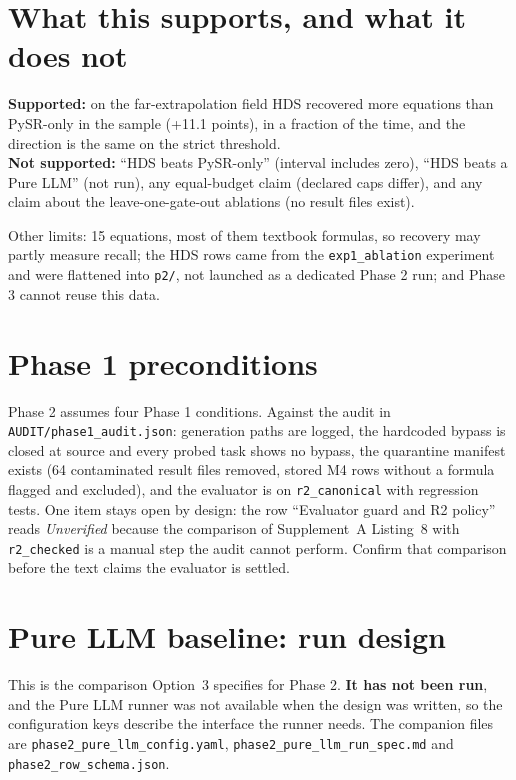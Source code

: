\documentclass[11pt,a4paper]{article}
\newcommand{\code}[1]{\texttt{#1}}
\begin{document}
\section{What this supports, and what it does not}
\begin{caution}
\textbf{Supported:} on the far-extrapolation field HDS recovered more equations than PySR-only in the sample (+11.1 points), in a fraction of the time, and the direction is the same on the strict threshold.\\
\textbf{Not supported:} ``HDS beats PySR-only'' (interval includes zero), ``HDS beats a Pure LLM'' (not run), any equal-budget claim (declared caps differ), and any claim about the leave-one-gate-out ablations (no result files exist).
\end{caution}
Other limits: 15 equations, most of them textbook formulas, so recovery may partly measure recall; the HDS rows came from the \code{exp1\_ablation} experiment and were flattened into \code{p2/}, not launched as a dedicated Phase 2 run; and Phase 3 cannot reuse this data.

\section{Phase 1 preconditions}
Phase 2 assumes four Phase 1 conditions. Against the audit in \code{AUDIT/phase1\_audit.json}: generation paths are logged, the hardcoded bypass is closed at source and every probed task shows no bypass, the quarantine manifest exists (64 contaminated result files removed, stored M4 rows without a formula flagged and excluded), and the evaluator is on \code{r2\_canonical} with regression tests. One item stays open by design: the row ``Evaluator guard and R2 policy'' reads \emph{Unverified} because the comparison of Supplement~A Listing~8 with \code{r2\_checked} is a manual step the audit cannot perform. Confirm that comparison before the text claims the evaluator is settled.

\section{Pure LLM baseline: run design}
This is the comparison Option~3 specifies for Phase 2. \textbf{It has not been run}, and the Pure LLM runner was not available when the design was written, so the configuration keys describe the interface the runner needs. The companion files are \code{phase2\_pure\_llm\_config.yaml}, \code{phase2\_pure\_llm\_run\_spec.md} and \code{phase2\_row\_schema.json}.
\end{document}
